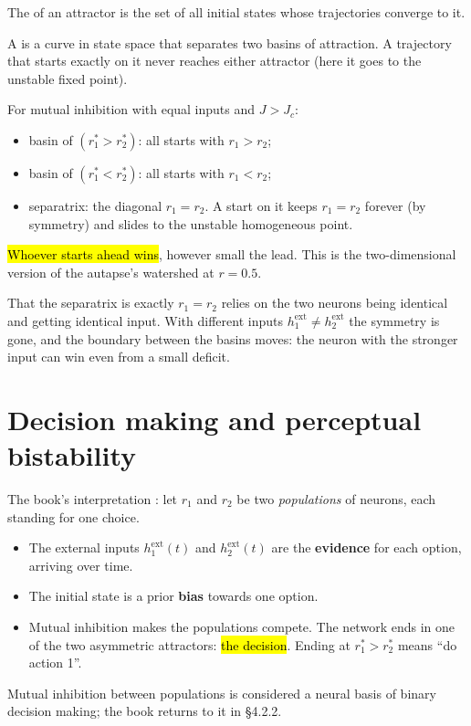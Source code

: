 \begin{defn}
The  of an attractor is the set of all initial states whose trajectories converge to it.
\end{defn}

\begin{defn}[Separatrix]
A  is a curve in state space that separates two basins of attraction. A trajectory that starts exactly on it never reaches either attractor (here it goes to the unstable fixed point).
\end{defn}

For mutual inhibition with equal inputs and $J>J_c$:
\begin{itemize}
  \item basin of $(r_1^*>r_2^*)$: all starts with $r_1>r_2$;
  \item basin of $(r_1^*<r_2^*)$: all starts with $r_1<r_2$;
  \item separatrix: the diagonal $r_1=r_2$. A start on it keeps $r_1=r_2$ forever (by symmetry) and slides to the unstable homogeneous point.
\end{itemize}
\hl{Whoever starts ahead wins}, however small the lead. This is the two-dimensional version of the autapse's watershed at $r=0.5$.

\begin{pitfall}
That the separatrix is exactly $r_1=r_2$ relies on the two neurons being identical and getting identical input. With different inputs $h_1^{\text{ext}}\neq h_2^{\text{ext}}$ the symmetry is gone, and the boundary between the basins moves: the neuron with the stronger input can win even from a small deficit.
\end{pitfall}

\section{Decision making and perceptual bistability}

The book's interpretation : let $r_1$ and $r_2$ be two \emph{populations} of neurons, each standing for one choice.
\begin{itemize}
  \item The external inputs $h_1^{\text{ext}}(t)$ and $h_2^{\text{ext}}(t)$ are the \textbf{evidence} for each option, arriving over time.
  \item The initial state is a prior \textbf{bias} towards one option.
  \item Mutual inhibition makes the populations compete. The network ends in one of the two asymmetric attractors: \hl{the decision}. Ending at $r_1^*>r_2^*$ means ``do action 1''.
\end{itemize}
Mutual inhibition between populations is considered a neural basis of binary decision making; the book returns to it in \S4.2.2.

